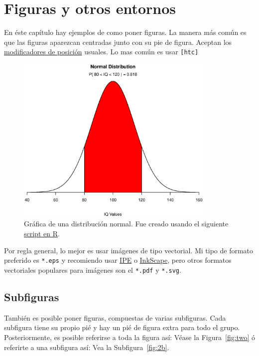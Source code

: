 \chapter{Figuras y otros entornos}
\label{chap:figuras}
En éste capítulo hay ejemplos de como poner figuras.
La manera más común es que las figuras aparezcan centradas junto con su pie de figura.
Aceptan los \href{https://en.wikibooks.org/wiki/LaTeX/Floats,_Figures_and_Captions#Figures}{modificadores de posición} usuales.
Lo mas común es usar \texttt{[htc]}
 
\begin{figure}[htb]
  \centering
  \label{fig:normalDist}
  \includegraphics[width=0.85\textwidth]{img/cap02/normal}
  \caption[Distribución normal]{Gráfica de una distribución normal. Fue creado usando el siguiente \href{https://www.statmethods.net/advgraphs/probability.html}{script en R}.}
\end{figure}

Por regla general, lo mejor es usar imágenes de tipo vectorial.
Mi tipo de formato preferido es \verb|*.eps| y recomiendo usar \href{https://ipe.otfried.org/}{IPE} o \href{https://inkscape.org/}{InkScape}, pero otros formatos vectoriales populares para imágenes son el \verb|*.pdf| y \verb|*.svg|.

\section{Subfiguras}

También es posible poner figuras, compuestas de varias subfiguras.
Cada subfigura tiene su propio pié y hay un pié de figura extra para todo el grupo.
Posteriormente, es posible referirse a toda la figura así: Véase la  Figura~\ref{fig:two} ó referirte a una subfigura así:
Vea la Subfigura~\ref{fig:2b}.

